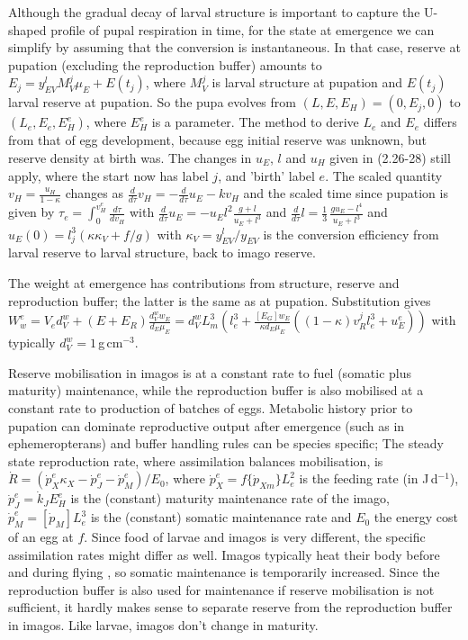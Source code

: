 Although the gradual decay of larval structure is important to capture the U-shaped profile of pupal respiration in time, for the state at emergence we can simplify by assuming that the conversion is instantaneous. 
In that case, reserve  at pupation (excluding the reproduction buffer) amounts to $E_j = y_{EV}^l M_V^j \mu_E + E(t_j)$, where $M_V^j$ is larval structure at pupation and $E(t_j)$ larval reserve at pupation.
So the pupa evolves from $(L, E, E_H) = (0, E_j, 0)$ to $(L_e, E_e, E_H^e)$, where $E_H^e$ is a parameter.
The method to derive $L_e$ and $E_e$ differs from that of egg development, because egg initial reserve was unknown, but reserve density at birth was.
The changes in $u_E$, $l$ and $u_H$ given in (2.26-28) still apply, where the start now has label $j$, and 'birth' label $e$.
The scaled quantity $v_H = \frac{u_H} {1 - \kappa}$ changes as $\frac{d} {d \tau} v_H = - \frac{d}{d \tau} u_E - k v_H$ and the scaled time since pupation is given by $\tau_e = \int_0^{v_H^e} \frac{d \tau} {d v_H}$ with $\frac{d} {d \tau} u_E =  - u_E l^2 \frac{g + l} {u_E + l^3}$ and $\frac{d} {d \tau} l =  \frac{1} {3} \, \frac{g u_E - l^4} {u_E + l^3}$ and $u_E(0) = l_j^3 (\kappa \kappa_V + f/ g)$ with $\kappa_V = y_{EV}^l/ y_{EV}$ is the conversion efficiency from larval reserve to larval structure, back to imago reserve.

The weight at emergence has contributions from structure, reserve and reproduction buffer; 
the latter is the same as at pupation.
Substitution gives $W_w^e = V_e d_V^w + (E + E_R) \frac{d_V^w w_E} {d_E \mu_E} = d_V^w L_m^3 (l_e^3 + \frac{[E_G] w_E} {\kappa d_E \mu_E} ((1 - \kappa) v_R^j l_e^3 + u_E^e))$ with typically $d_V^w = 1$\,g\,cm$^{-3}$.

Reserve mobilisation in imagos is at a constant rate to fuel (somatic plus maturity) maintenance, while the reproduction buffer is also mobilised at a constant rate to production of batches of eggs.
Metabolic history prior to pupation can dominate reproductive output after emergence (such as in ephemeropterans) and buffer handling rules can be species specific; 
The steady state reproduction rate, where assimilation balances mobilisation, is $\dot{R} = (\dot{p}_X^e \kappa_X - \dot{p}_J^e - \dot{p}_M^e)/ E_0$, where $\dot{p}_X^e = f \{\dot{p}_{Xm}\} L_e^2$ is the feeding rate (in J\,d$^{-1}$), $\dot{p}_J^e = \dot{k}_J E_H^e$ is the (constant) maturity maintenance rate of the imago, $\dot{p}_M^e = [\dot{p}_M] L_e^3$ is the (constant) somatic maintenance rate and $E_0$ the energy cost of an egg at $f$.
Since food of larvae and imagos is very different, the specific assimilation rates might differ as well.
Imagos typically heat their body before and during flying \cite{Hein93}, so somatic maintenance is temporarily increased.
Since the reproduction buffer is also used for maintenance if reserve mobilisation is not sufficient, it hardly makes sense to separate reserve from the reproduction buffer in imagos.
Like larvae, imagos don't change in maturity.

